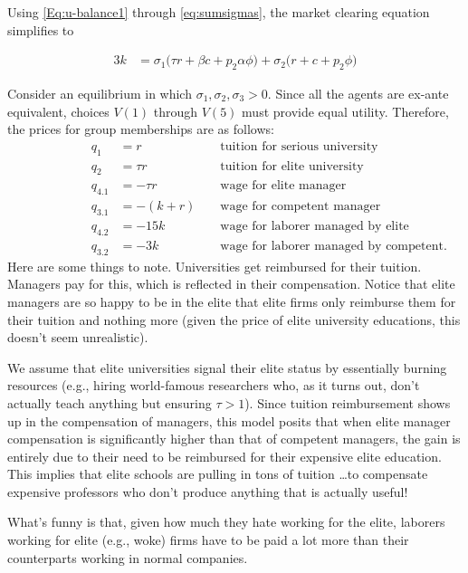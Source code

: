 \documentclass[12pt,letterpaper]{article}
\begin{document}
	Using \eqref{Eq:u-balance1} through \eqref{eq:sumsigmas}, the market clearing equation simplifies to
	
	\begin{align}
		3k&=\sigma_1
		\Big(
		\tau r + \beta c + p_2\alpha\phi
		\Big) 
		+\sigma_2
		\Big(
		r + c + p_2\phi
		\Big)\label{MktClear}
	\end{align}
	
	Consider an equilibrium in which $\sigma_1,\sigma_2,\sigma_3>0$. 
	Since all the agents are ex-ante equivalent, choices $V(1)$ through $V(5)$ must provide equal utility.
	Therefore, the prices for group memberships are as follows:
	\begin{align*}
	\phantom{====}	q_1&=r&&\text{ tuition for serious university}\\
	\phantom{====}	q_2&=\tau r&&\text{ tuition for elite university}\\
	\phantom{====}	q_{4.1}&=-\tau r&&\text{ wage for elite manager}\\
	\phantom{====}	q_{3.1}&=-(k+r)&&\text{ wage for competent manager}\\
	\phantom{====}	q_{4.2}&=-15k&&\text{ wage for laborer managed by elite}\\
	\phantom{====}	q_{3.2}&=-3k&&\text{ wage for laborer managed by competent}.		
	\end{align*}
	Here are some things to note. 
	Universities get reimbursed for their tuition.
	Managers pay for this, which is reflected in their compensation. 
	Notice that elite managers are so happy to be in the elite that elite firms only reimburse them for their tuition and nothing more (given the price of elite university educations, this doesn't seem unrealistic).
	
	We assume that elite universities signal their elite status by essentially burning resources (e.g., hiring world-famous researchers who, as it turns out, don't actually teach anything but ensuring $\tau>1$).
	Since tuition reimbursement shows up in the compensation of managers, this model posits that when elite manager compensation is significantly higher than that of competent managers, the gain is entirely due to their need to be reimbursed for their expensive elite education.
	This implies that elite schools are pulling in tons of tuition \ldots to compensate expensive professors who don't produce anything that is actually useful! 
	
	What's funny is that, given how much they hate working for the elite, laborers working for elite (e.g., woke) firms have to be paid a lot more than their counterparts working in normal companies.
	
\end{document}
